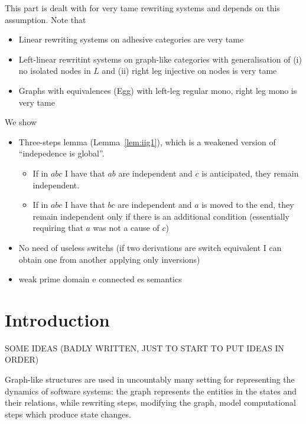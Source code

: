 \documentclass[a4paper]{article}
\theoremstyle{definition}
\begin{document}
This part is dealt with for very tame rewriting systems and depends on this assumption. Note that
\begin{itemize}
\item Linear rewriting systems on adhesive categories are very tame
\item Left-linear rewritint systems on graph-like categories with generalisation of (i) no isolated nodes in $L$ and (ii) right leg injective on nodes is very tame
\item Graphs with equivalences (Egg) with left-leg regular mono, right leg mono is very tame
\end{itemize}

We show
\begin{itemize}

  
\item Three-steps lemma (Lemma~\ref{lem:iig1}), which is a weakened version of ``indepedence is global''.
  \begin{itemize}
    
  \item If in $abc$ I have that $ab$ are independent and $c$ is anticipated, they remain independent.
  \item  If in $abc$ I have that $bc$ are independent and $a$ is moved to the end, they remain independent only if there is an additional condition (essentially requiring that $a$ was not a cause of $c$)
  \end{itemize}

  
  
\item No need of useless switchs (if two derivations are switch equivalent I can obtain one from another applying only inversions)

\item weak prime domain e connected es semantics
\end{itemize}


\section{Introduction}


SOME IDEAS (BADLY WRITTEN, JUST TO START TO PUT IDEAS IN ORDER)

Graph-like structures are used in uncountably many setting for representing the dynamics of software systems: the graph represents the entities in the states and their relations, while rewriting steps, modifying the graph, model computational steps which produce state changes.
\end{document}
